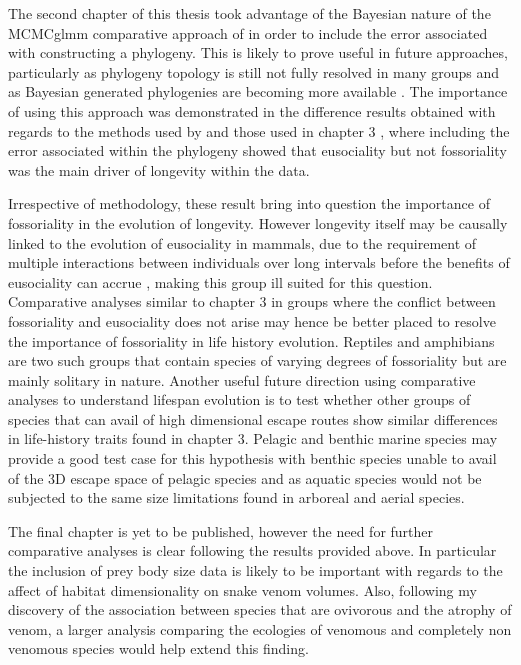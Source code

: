 The second chapter of this thesis took advantage of the Bayesian nature of the MCMCglmm comparative approach of \cite{hadfield2010mcmc} in order to include the error associated with constructing a phylogeny. This is likely to prove useful in future approaches, particularly as phylogeny topology is still not fully resolved in many groups \citep{jetz2012global,burleigh2015building,pyron2014early} and as Bayesian generated phylogenies are becoming more available \citep{arnold201010ktrees,jetz2012global}. The importance of using this approach was demonstrated in the difference results obtained with regards to the methods used by \cite{williams2015ecology} and those used in chapter 3 \citep{healy2014ecology,healy2015eusociality}, where including the error associated within the phylogeny showed that eusociality but not fossoriality was the main driver of longevity within the data. 

Irrespective of methodology, these result bring into question the importance of fossoriality in the evolution of longevity. However longevity itself may be causally linked to the evolution of eusociality in mammals, due to the requirement of multiple interactions between individuals over long intervals before the benefits of eusociality can accrue \citep{LukeM}, making this group ill suited for this question. Comparative analyses similar to chapter 3 in groups where the conflict between fossoriality and eusociality does not arise may hence be better placed to resolve the importance of fossoriality in life history evolution. Reptiles and amphibians are two such groups that contain species of varying degrees of fossoriality but are mainly solitary in nature. Another useful future direction using comparative analyses to understand lifespan evolution is to test whether other groups of species that can avail of high dimensional escape routes show similar differences in life-history traits found in chapter 3. Pelagic and benthic marine species may provide a good test case for this hypothesis with benthic species unable to avail of the 3D escape space of pelagic species and as aquatic species would not be subjected to the same size limitations found in arboreal and aerial species.

The final chapter is yet to be published, however the need for further comparative analyses is clear following the results provided above. In particular the inclusion of prey body size data is likely to be important with regards to the affect of habitat dimensionality on snake venom volumes. Also, following my discovery of the association between species that are ovivorous and the atrophy of venom, a larger analysis comparing the ecologies of venomous and completely non venomous species would help extend this finding.


